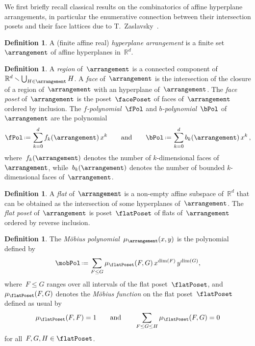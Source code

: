 \documentclass{amsart}
\newcommand{\darkblue}{\color{darkblue}} %
\theoremstyle{definition}
\newtheorem{definition}[theorem]{Definition}
\newcommand{\R}{\mathbb{R}} %
\newcommand{\ssm}{\smallsetminus} %
\newcommand{\eqdef}{\mbox{\,\raisebox{0.2ex}{\scriptsize\ensuremath{\mathrm:}}\ensuremath{=}\,}} %
\newcommand{\defn}[1]{\textsl{\darkblue #1}} %
\begin{document}
We first briefly recall classical results on the combinatorics of affine hyperplane arrangements, in particular the enumerative connection between their intersection posets and their face lattices due to T.~Zaslavsky~\cite{Zaslavsky}.

\begin{definition}
A (finite affine real) \defn{hyperplane arrangement} is a finite set~$\arrangement$ of affine hyperplanes in~$\R^d$.
\end{definition}

\begin{definition}
A \defn{region} of~$\arrangement$ is a connected component of~$\R^d \ssm \bigcup_{H \in \arrangement} H$.
A \defn{face} of~$\arrangement$ is the intersection of the closure of a region of~$\arrangement$ with an hyperplane of~$\arrangement$.
The \defn{face poset} of~$\arrangement$ is the poset~$\facePoset$ of faces of~$\arrangement$ ordered by inclusion.
The \defn{$f$-polynomial}~$\fPol$ and \defn{$b$-polynomial}~$\bPol$ of~$\arrangement$ are the polynomial
\[
\fPol \eqdef \sum_{k = 0}^d f_k(\arrangement) \, x^k
\qquad\text{and}\qquad
\bPol \eqdef \sum_{k = 0}^d b_k(\arrangement) \, x^k \, ,
\]
where~$f_k(\arrangement)$ denotes the number of $k$-dimensional faces of~$\arrangement$, while~$b_k(\arrangement)$ denotes the number of bounded $k$-dimensional faces of~$\arrangement$.
\end{definition}

\begin{definition}
A \defn{flat} of~$\arrangement$ is a non-empty affine subspace of~$\R^d$ that can be obtained as the intersection of some hyperplanes of~$\arrangement$.
The \defn{flat poset} of~$\arrangement$ is poset~$\flatPoset$ of flats of~$\arrangement$ ordered by reverse inclusion.
\end{definition}

\begin{definition}
\label{def:MobiusPolynomial}
The \defn{M\"obius polynomial}~$\mu_{\arrangement}(x,y)$ is the polynomial defined by
\[
\mobPol \eqdef \sum_{F \le G} \mu_{\flatPoset}(F,G) \, x^{\dim(F)} \, y^{\dim(G)},
\]
where~$F \le G$ ranges over all intervals of the flat poset~$\flatPoset$, and~$\mu_{\flatPoset}(F,G)$ denotes the \defn{M\"obius function} on the flat poset~$\flatPoset$ defined as usual by
\[
\mu_{\flatPoset}(F, F) = 1
\qquad\text{and}\qquad
\sum_{F \le G \le H} \mu_{\flatPoset}(F,G) = 0
\]
for all~$F, G, H \in \flatPoset$.
\end{definition}
\end{document}
